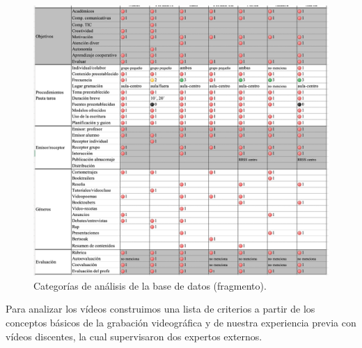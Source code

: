 \documentclass[spanish]{textolivre}
\begin{document}
\begin{figure}[htbp]
 \centering
 \includegraphics[width=\textwidth]{Fig3.png}
 \caption{Categorías de análisis de la base de datos (fragmento).}
 \label{fig03}
\end{figure}

Para analizar los vídeos construimos una lista de criterios a partir de los conceptos básicos de la grabación videográfica y de nuestra experiencia previa con vídeos discentes, la cual supervisaron dos expertos externos.
\end{document}
